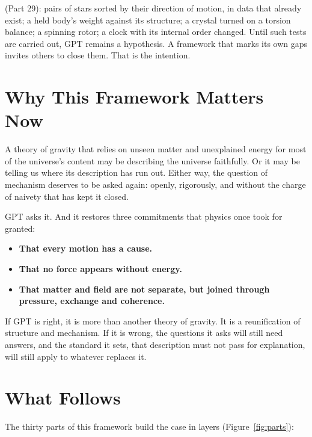 \documentclass[11pt,a4paper]{article}
\begin{document}
 (Part 29): pairs of stars sorted by their direction of motion, in data that already exist; a held body's weight against its structure; a crystal turned on a torsion balance; a spinning rotor; a clock with its internal order changed. Until such tests are carried out, GPT remains a hypothesis. A framework that marks its own gaps invites others to close them. That is the intention.

\section{Why This Framework Matters Now}

A theory of gravity that relies on unseen matter and unexplained energy for most of the universe's content may be describing the universe faithfully. Or it may be telling us where its description has run out. Either way, the question of mechanism deserves to be asked again: openly, rigorously, and without the charge of naivety that has kept it closed.

GPT asks it. And it restores three commitments that physics once took for granted:

\begin{itemize}
  \item \textbf{That every motion has a cause.}
  \item \textbf{That no force appears without energy.}
  \item \textbf{That matter and field are not separate, but joined through pressure, exchange and coherence.}
\end{itemize}

If GPT is right, it is more than another theory of gravity. It is a reunification of structure and mechanism. If it is wrong, the questions it asks will still need answers, and the standard it sets, that description must not pass for explanation, will still apply to whatever replaces it.

\section{What Follows}

The thirty parts of this framework build the case in layers (Figure~\ref{fig:parts}):
\end{document}
